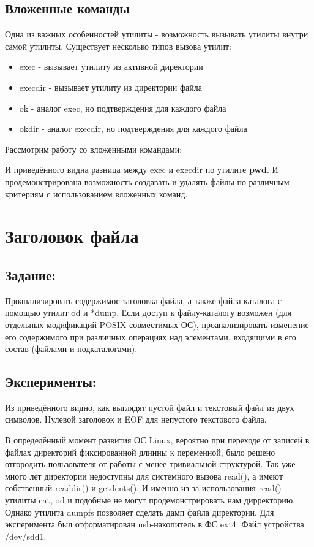 \documentclass[a4paper]{article}
\begin{document}
\subsection{Вложенные команды}
Одна из важных особенностей утилиты - возможность вызывать утилиты внутри самой утилиты. Существует несколько типов вызова утилит:
\begin{itemize}
\item exec - вызывает утилиту из активной директории
\item execdir - вызывает утилиту из директории файла
\item ok - аналог exec, но подтверждения для каждого файла
\item okdir - аналог execdir, но подтверждения для каждого файла
\end{itemize}
Рассмотрим работу со вложенными командами:

И приведённого видна разница между exec и execdir по утилите \textbf{pwd}. И продемонстрирована возможность создавать и удалять файлы по различным критериям с использованием вложенных команд.
\section{Заголовок файла} \subsection{Задание:}Проанализировать содержимое заголовка файла, а также файла-каталога с помощью утилит od  и  *dump. 
Если доступ к файлу-каталогу возможен (для отдельных модификаций POSIX-совместимых ОС), проанализировать изменение его содержимого при различных операциях над элементами, входящими в его состав (файлами и подкаталогами).  
\subsection{Эксперименты:}

Из приведённого видно, как выглядят пустой файл и текстовый файл из двух символов. Нулевой заголовок и EOF для непустого текстового файла.

В определённый момент развития ОС Linux, вероятно при переходе от записей в файлах директорий фиксированной длинны к переменной, было решено отгородить пользователя от работы с менее тривиальной структурой. Так уже много лет директории недоступны для системного вызова read(), а имеют собственный readdir() и getdents(). И именно из-за использования read() утилиты cat, od и подобные не могут продемонстрировать нам дирректорию. Однако утилита dumpfs позволяет сделать дамп файла директории. Для эксперимента был отформатирован usb-накопитель в ФС ext4. Файл устройства /dev/sdd1.\\
\end{document}
